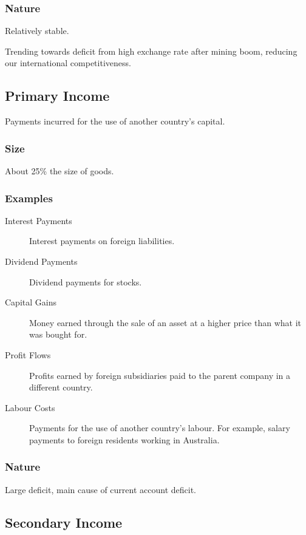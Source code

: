 \documentclass[a4paper,11pt]{report}
\begin{document}
\subsubsection{Nature}

Relatively stable.

Trending towards deficit from high exchange rate after mining boom, reducing
our international competitiveness.

\subsection{Primary Income}

Payments incurred for the use of another country's capital.

\subsubsection{Size}

About 25\% the size of goods.

\subsubsection{Examples}

\begin{description}
\item [Interest Payments] Interest payments on foreign liabilities.
\item [Dividend Payments] Dividend payments for stocks.
\item [Capital Gains] Money earned through the sale of an asset at a higher
	price than what it was bought for.
\item [Profit Flows] Profits earned by foreign subsidiaries paid to the parent
	company in a different country.
\item [Labour Costs] Payments for the use of another country's labour. For
	example, salary payments to foreign residents working in Australia.
\end{description}

\subsubsection{Nature}

Large deficit, main cause of current account deficit.

\subsection{Secondary Income}
\end{document}
